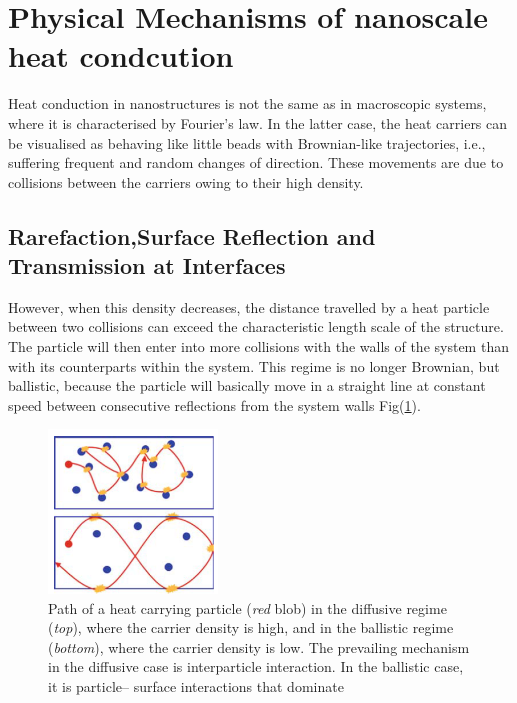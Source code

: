 \section{Physical Mechanisms of nanoscale heat condcution}
Heat conduction in nanostructures is not the same as in macroscopic systems, where
it is characterised by Fourier’s law. In the latter case, the heat carriers can be visualised
as behaving like little beads with Brownian-like trajectories, i.e., suffering frequent and random changes of direction. These movements are due to collisions
between the carriers owing to their high density.
\subsection{Rarefaction,Surface Reflection and Transmission at Interfaces}
However, when this density decreases, the distance travelled by a heat particle between
two collisions can exceed the characteristic length scale of the structure. The
particle will then enter into more collisions with the walls of the system than with
its counterparts within the system. This regime is no longer Brownian, but ballistic,
because the particle will basically move in a straight line at constant speed between
consecutive reflections from the system walls Fig(\ref{fig:mingo}).\\
\begin{figure}[htbp!] 
\centering    
\includegraphics[width=0.4\textwidth]{1.png}
\caption[ballistic]{Path of a heat carrying particle (\textit{red} blob) in the diffusive regime (\textit{top}), where the carrier
density is high, and in the ballistic regime (\textit{bottom}), where the carrier density is low. The prevailing
mechanism in the diffusive case is interparticle interaction. In the ballistic case, it is particle–
surface interactions that dominate\cite{mingolbook}}
\label{fig:mingo}
\end{figure}{}

